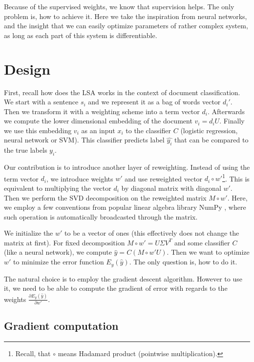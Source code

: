     Because of the supervised weights, we know that supervision helps. 
    The only problem is, how to achieve it. 
    Here we take the inspiration from neural networks, and the insight that we can easily optimize parameters of rather complex system, as long as each part of this system is differentiable. 

\section{Design} \label{sec:design}

    First, recall how does the LSA works in the context of document classification.
    We start with a sentence $s_i$ and we represent it as a bag of words vector $d_i'$. 
    Then we transform it with a weighting scheme into a term vector $d_i$.
    Afterwards we compute the lower dimensional embedding of the document $v_i = d_i U$. 
    Finally we use this embedding $v_i$ as an input $x_i$ to the classifier $C$ (logistic regression, neural network or SVM).
    This classifier predicts label $\hat{y_i}$ that can be compared to
    the true labels $y_i$.
    
    Our contribution is to introduce another layer of reweighting. 
    Instead of using the term vector $d_i$, we introduce weights $w'$ and use reweighted vector $d_i \circ w'$\footnote{Recall, that $\circ$ means Hadamard product (pointwise multiplication).}.
    This is equivalent to multiplying the vector $d_i$ by diagonal matrix with diagonal $w'$.
    Then we perform the SVD decomposition on the reweighted matrix $M \circ w'$. 
    Here, we employ a few conventions from popular linear algebra library NumPy \cite{oliphant2006guide}, 
    where such operation is automatically broadcasted through the matrix.
    
    We initialize the $w'$ to be a vector of ones (this effectively does not change the matrix at first).
    For fixed decomposition $M\circ w'= U\Sigma V^T$ and some classifier $C$ (like a neural network),
    we compute $\hat{y} = C(M \circ w' U)$.
    Then we want to optimize $w'$ to minimize the error function $E_y(\hat{y})$.
    The only question is, how to do it.
    
    The natural choice is to employ the gradient descent algorithm. 
    However to use it, we need to be able to compute the gradient of error with regards to the weights $\frac{\partial E_y(\hat{y})}{\partial w'}$.
    
    \subsection{Gradient computation}
    
